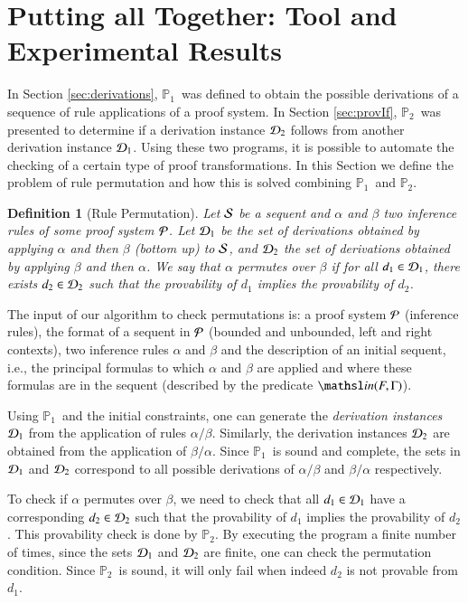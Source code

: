 \documentclass{new_tlp}
\newcommand{\In}[2]{\ensuremath{\tsl{in}(\ensuremath{#1},\ensuremath{#2})}}
\newcommand\LPder{\ensuremath{\mathbb{P}_1}}
\newcommand\LPprov{\ensuremath{\mathbb{P}_2}}
\newtheorem{definition}[theorem]{Definition}
\begin{document}
\section{Putting all Together: Tool and Experimental Results}
\label{sec:together}

In Section \ref{sec:derivations}, \LPder\ was defined to obtain the
possible derivations of a sequence of rule applications of a proof system. In
Section \ref{sec:provIf}, \LPprov\ was presented to determine if a
derivation instance $\Dscr_2$ follows from another derivation instance $\Dscr_1$. Using these two
programs, it is possible to automate the checking of a certain type of proof
transformations. In this Section we define the problem of rule permutation and
how this is solved combining \LPder\ and \LPprov.

\begin{definition}[Rule Permutation]
Let $\Sscr$ be a sequent and $\alpha$ and $\beta$ two inference rules of some
proof system $\Pscr$. Let $\Dscr_1$ be the set of derivations obtained by
applying $\alpha$ and then $\beta$ (bottom up) to $\Sscr$, and $\Dscr_2$ the set
of derivations obtained by applying $\beta$ and then $\alpha$. We say that
$\alpha$ \emph{permutes over} $\beta$ if for all $d_1 \in \Dscr_1$, there exists
$d_2 \in \Dscr_2$ such that the provability of $d_1$ implies the provability of
$d_2$.
\end{definition}

The input of our algorithm to check permutations is: a proof system $\Pscr$
(inference rules), the format of a sequent in $\Pscr$ (bounded and unbounded,
left and right contexts), two inference rules $\alpha$ and $\beta$ and the
description of an initial sequent, i.e., the principal formulas to which
$\alpha$ and $\beta$ are applied and where these formulas are in the sequent
(described by the predicate $\In{F}{\Gamma}$).

Using \LPder\ and the initial constraints, one can generate the \emph{derivation
instances} $\Dscr_1$ from the application of rules $\alpha / \beta$. Similarly,
the derivation instances $\Dscr_2$ are obtained from the application of $\beta / \alpha$.
Since \LPder\ is sound and complete, the sets in $\Dscr_1$ and $\Dscr_2$
correspond to all possible derivations of $\alpha / \beta$ and $\beta / \alpha$
respectively.

To check if $\alpha$ permutes over $\beta$, we need to check that all $d_1 \in
\Dscr_1$ have a corresponding $d_2 \in \Dscr_2$ such that the provability of
$d_1$ implies the provability of $d_2$. This provability check is done by
\LPprov. By executing the program a finite number of times, since the sets $\Dscr_1$
and $\Dscr_2$ are finite, one can check the permutation condition. Since
\LPprov\ is sound, it will only fail when indeed $d_2$ is not provable from
$d_1$.
\end{document}
